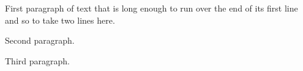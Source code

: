 \documentclass{article}
\begin{document}
First paragraph of text that is long enough to run over the end of its first line and so to take two lines here.

Second paragraph.

Third paragraph.
\end{document}
